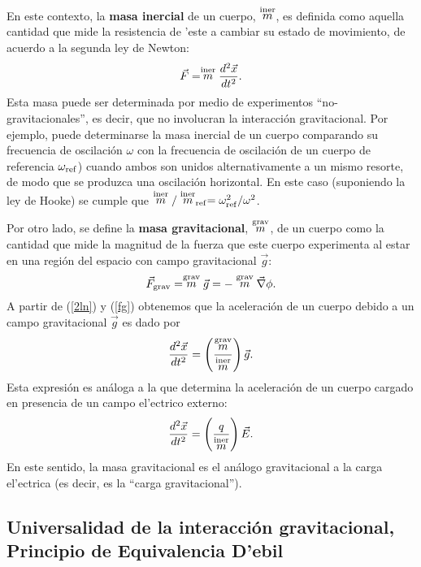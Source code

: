 En este contexto, la \textbf{masa inercial} de un cuerpo, $\stackrel{\rm iner}{m}$, es definida como aquella cantidad que mide la resistencia de 'este a cambiar su estado de movimiento, de acuerdo a la segunda ley de Newton:
\begin{equation}\label{2ln}
\vec{F}=\stackrel{\rm iner}{m}\frac{d^2\vec{x}}{dt^2}.
\end{equation}
Esta masa puede ser determinada por medio de experimentos ``no-gravitacionales'', es decir, que no involucran la interacción gravitacional. Por ejemplo, puede determinarse la masa inercial de un cuerpo comparando su frecuencia de oscilación $\omega$ con la frecuencia de oscilación de un cuerpo de referencia $\omega_{\rm ref}$) cuando ambos son unidos alternativamente a un mismo resorte, de modo que se produzca una oscilación horizontal. En este caso (suponiendo la ley de Hooke) se cumple que $\stackrel{\rm iner}{m}/\stackrel{\rm iner}{m}_{\rm ref}=\omega_{\rm ref}^2/\omega^2$.

Por otro lado, se define la \textbf{masa gravitacional}, $\stackrel{\rm grav}{m}$, de un cuerpo como la cantidad que mide la magnitud de la fuerza que este cuerpo experimenta al estar en una región del espacio con campo gravitacional $\vec{g}$:
\begin{equation}\label{fg}
\vec{F}_{\rm grav}=\stackrel{\rm grav}{m}\vec{g}=-\stackrel{\rm grav}{m}\vec\nabla\phi.
\end{equation}
A partir de (\ref{2ln}) y (\ref{fg}) obtenemos que la aceleración de un cuerpo debido a un campo gravitacional $\vec{g}$ es dado por
\begin{equation}\label{amimg}
\frac{d^2\vec{x}}{dt^2}=\left(\frac{\stackrel{\rm grav}{m}}{\stackrel{\rm iner}{m}}\right)\vec{g}.
\end{equation}
Esta expresión es análoga a la que determina la aceleración de un cuerpo cargado en presencia de un campo el'ectrico externo:
\begin{equation}\label{aqE}
\frac{d^2\vec{x}}{dt^2}=\left(\frac{q}{\stackrel{\rm iner}{m}}\right)\vec{E}.
\end{equation}
En este sentido, la masa gravitacional es el análogo gravitacional a la carga el'ectrica (es decir, es la ``carga gravitacional'').


\subsection{Universalidad de la interacción gravitacional, Principio de Equivalencia D'ebil}

